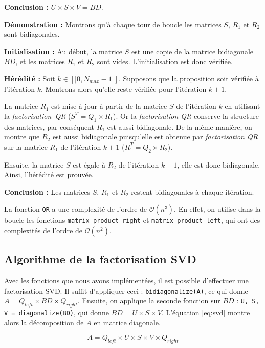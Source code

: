 	\medbreak\noindent
	\textbf{Conclusion :} $U \times S \times V = BD$.
\qedsymbol
\bigbreak

\bigbreak
\noindent\textbf{Démonstration :}
Montrons qu'à chaque tour de boucle les matrices $S$, $R_1$ et $R_2$ sont bidiagonales.

	\medbreak\noindent
	\textbf{Initialisation :} Au début, la matrice $S$ est une copie de la matrice bidiagonale $BD$, et les matrices $R_1$ et $R_2$ sont vides. 
	L'initialisation est donc vérifiée.

	\medbreak\noindent
	\textbf{Hérédité :} Soit $k \in [|0, N_{max} - 1|]$. Supposons que la proposition soit vérifiée à l'itération $k$.
	Montrons alors qu'elle reste vérifiée pour l'itération $k + 1$.

	La matrice $R_1$ est mise à jour à partir de la matrice $S$ de l'itération $k$ en utilisant la \textit{factorisation~QR} ($S^T = Q_1 \times R_1$). Or la \textit{factorisation QR} 
	conserve la structure des matrices, par conséquent $R_1$ est aussi bidiagonale. De la même manière, on montre que $R_2$ est aussi bidiagonale 
	puisqu'elle est obtenue par \textit{factorisation QR} sur la matrice $R_1$ de l'itération $k + 1$ ($R_1^T = Q_2 \times R_2$).

	Ensuite, la matrice $S$ est égale à $R_2$ de l'itération $k + 1$, elle est donc bidiagonale.
	Ainsi, l'hérédité est prouvée.

	\medbreak\noindent
	\textbf{Conclusion :} Les matrices $S$, $R_1$ et $R_2$ restent bidiagonales à chaque itération.
\qedsymbol
\bigbreak

La fonction \verb|QR| a une complexité de l'ordre de $\mathcal{O}(n^3)$.
En effet, on utilise dans la boucle les fonctions \verb|matrix_product_right| et \verb|matrix_product_left|, qui ont des complexités de l'ordre de $\mathcal{O}(n^2)$.

\subsection{Algorithme de la factorisation SVD}
Avec les fonctions que nous avons implémentées, il est possible d'effectuer une factorisation SVD.
Il suffit d'appliquer ceci : \verb|bidiagonalize(A)|, ce qui donne $A = Q_{left} \times BD \times Q_{right}$.
Ensuite, on applique la seconde fonction sur $BD$ : \verb|U, S, V = diagonalize(BD)|, qui donne $BD = U \times S \times V$.
L'équation \ref{eq:svd} montre alors la décomposition de $A$ en matrice diagonale.

\begin{equation}
	A = Q_{left} \times U \times S \times V \times Q_{right}
	\label{eq:svd}
\end{equation}


